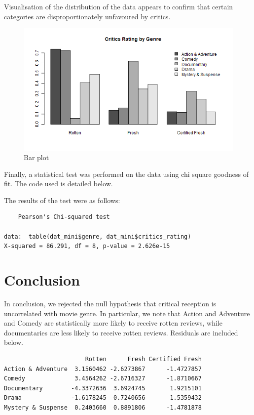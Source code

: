\documentclass[12pt,a4paper]{article}
\begin{document}
Visualisation of the distribution of the data appears to confirm that certain categories are disproportionately unfavoured by critics.

\begin{figure}[h!]\centering
	\caption{\footnotesize Bar plot}
	\includegraphics[width=.75\textwidth]{barplot.png}
\end{figure} 

Finally, a statistical test was performed on the data using chi square goodness of fit. The code used is detailed below.



The results of the test were as follows:

\begin{verbatim}
	Pearson's Chi-squared test

data:  table(dat_mini$genre, dat_mini$critics_rating)
X-squared = 86.291, df = 8, p-value = 2.626e-15
\end{verbatim}

\section*{Conclusion}

In conclusion, we rejected the null hypothesis that critical reception is uncorrelated with movie genre. In particular, we note that Action and Adventure and Comedy are statistically more likely to receive rotten reviews, while documentaries are less likely to receive rotten reviews. Residuals are included below.

\begin{verbatim}
                       Rotten      Fresh Certified Fresh
Action & Adventure  3.1560462 -2.6273867      -1.4727857
Comedy              3.4564262 -2.6716327      -1.8710667
Documentary        -4.3372636  3.6924745       1.9215101
Drama              -1.6178245  0.7240656       1.5359432
Mystery & Suspense  0.2403660  0.8891806      -1.4781878
\end{verbatim}
\end{document}
